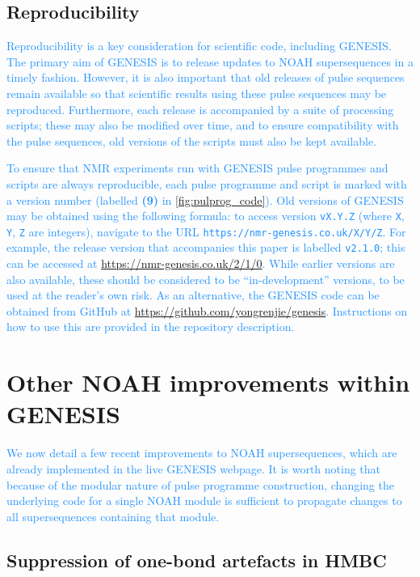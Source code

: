 \documentclass[a4paper,11pt]{article}
\newcommand{\changed}[1]{\textcolor{DodgerBlue}{#1}}
\begin{document}
\begin{refsection}
\subsection{Reproducibility}
\label{subsec:repro}

\changed{
    Reproducibility is a key consideration for scientific code, including GENESIS.\autocite{Perkel2020N}
    The primary aim of GENESIS is to release updates to NOAH supersequences in a timely fashion.
    However, it is also important that old releases of pulse sequences remain available so that scientific results using these pulse sequences may be reproduced. 
    Furthermore, each release is accompanied by a suite of processing scripts; these may also be modified over time, and to ensure compatibility with the pulse sequences, old versions of the scripts must also be kept available.
}

\changed{
    To ensure that NMR experiments run with GENESIS pulse programmes and scripts are always reproducible, each pulse programme and script is marked with a version number (labelled \textbf{(9)} in \cref{fig:pulprog_code}).
    Old versions of GENESIS may be obtained using the following formula: to access version \texttt{vX.Y.Z} (where \texttt{X}, \texttt{Y}, \texttt{Z} are integers), navigate to the URL \texttt{https://nmr-genesis.co.uk/X/Y/Z}.
    For example, the release version that accompanies this paper is labelled \texttt{v2.1.0}; this can be accessed at \url{https://nmr-genesis.co.uk/2/1/0}.
    While earlier versions are also available, these should be considered to be ``in-development'' versions, to be used at the reader's own risk.
    As an alternative, the GENESIS code can be obtained from GitHub at \url{https://github.com/yongrenjie/genesis}. Instructions on how to use this are provided in the repository description.
}


\section{Other NOAH improvements within GENESIS}

\changed{
    We now detail a few recent improvements to NOAH supersequences, which are already implemented in the live GENESIS webpage.
    It is worth noting that because of the modular nature of pulse programme construction, changing the underlying code for a single NOAH module is sufficient to propagate changes to all supersequences containing that module.
}

\subsection{Suppression of one-bond artefacts in HMBC}


\end{refsection}
\end{document}
